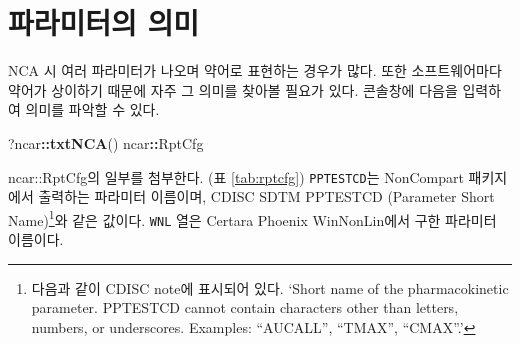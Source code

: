 \documentclass[
  11pt,
  krantz2, a4paper, twoside]{krantz}
\newenvironment{Shaded}{\begin{snugshade}}{\end{snugshade}}
\newcommand{\FunctionTok}[1]{\textcolor[rgb]{0.13,0.29,0.53}{\textbf{#1}}}
\newcommand{\NormalTok}[1]{#1}
\newcommand{\SpecialCharTok}[1]{\textcolor[rgb]{0.81,0.36,0.00}{\textbf{#1}}}
\theoremstyle{definition}
\theoremstyle{definition}
\theoremstyle{definition}
\theoremstyle{definition}
\theoremstyle{remark}
\begin{document}
\section{파라미터의 의미}\label{parameters}

NCA 시 여러 파라미터가 나오며 약어로 표현하는 경우가 많다. 또한 소프트웨어마다 약어가 상이하기 때문에 자주 그 의미를 찾아볼 필요가 있다. 콘솔창에 다음을 입력하여 의미를 파악할 수 있다.

\begin{Shaded}
\begin{Highlighting}[]
\NormalTok{?ncar}\SpecialCharTok{::}\FunctionTok{txtNCA}\NormalTok{()}
\NormalTok{ncar}\SpecialCharTok{::}\NormalTok{RptCfg}
\end{Highlighting}
\end{Shaded}

ncar::RptCfg의 일부를 첨부한다. (표 \ref{tab:rptcfg}) \texttt{PPTESTCD}는 NonCompart 패키지에서 출력하는 파라미터 이름이며, CDISC SDTM PPTESTCD (Parameter Short Name)\footnote{다음과 같이 CDISC note에 표시되어 있다. `Short name of the pharmacokinetic parameter. PPTESTCD cannot contain characters other than letters, numbers, or underscores. Examples: ``AUCALL'', ``TMAX'', ``CMAX''.'}와 같은 값이다. \texttt{WNL} 열은 Certara Phoenix WinNonLin에서 구한 파라미터 이름이다.
\end{document}
